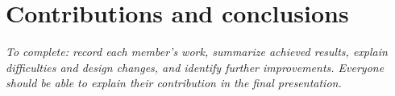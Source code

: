 \section{Contributions and conclusions}
\textit{To complete: record each member's work, summarize achieved results, explain difficulties and design changes, and identify further improvements. Everyone should be able to explain their contribution in the final presentation.}
